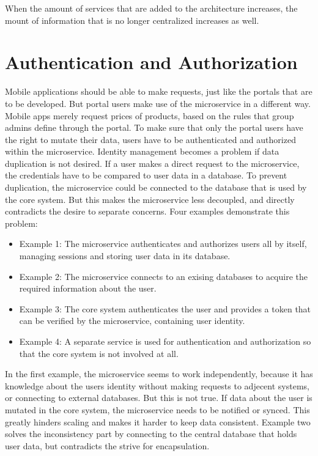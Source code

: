 When the amount of services that are added to the architecture increases, the mount of information that is no longer centralized increases as well.

\section{Authentication and Authorization}

Mobile applications should be able to make requests, just like the portals that are to be developed. But portal users make use of the microservice in a different way. Mobile apps merely request prices of products, based on the rules that group admins define through the portal. To make sure that only the portal users have the right to mutate their data, users have to be authenticated and authorized within the microservice. Identity management becomes a problem if data duplication is not desired. If a user makes a direct request to the microservice, the credentials have to be compared to user data in a database. To prevent duplication, the microservice could be connected to the database that is used by the core system. But this makes the microservice less decoupled, and directly contradicts the desire to separate concerns. Four examples demonstrate this problem:

\begin{itemize}
	\item Example 1: The microservice authenticates and authorizes users all by itself, managing sessions and storing user data in its database.
	\item Example 2: The microservice connects to an exising databases to acquire the required information about the user.
	\item Example 3: The core system authenticates the user and provides a token that can be verified by the microservice, containing user identity.
	\item Example 4: A separate service is used for authentication and authorization so that the core system is not involved at all.
\end{itemize}

In the first example, the microservice seems to work independently, because it has knowledge about the users identity without making requests to adjecent systems, or connecting to external databases. But this is not true. If data about the user is mutated in the core system, the microservice needs to be notified or synced. This greatly hinders scaling and makes it harder to keep data consistent. Example two solves the inconsistency part by connecting to the central database that holds user data, but contradicts the strive for encapsulation.

